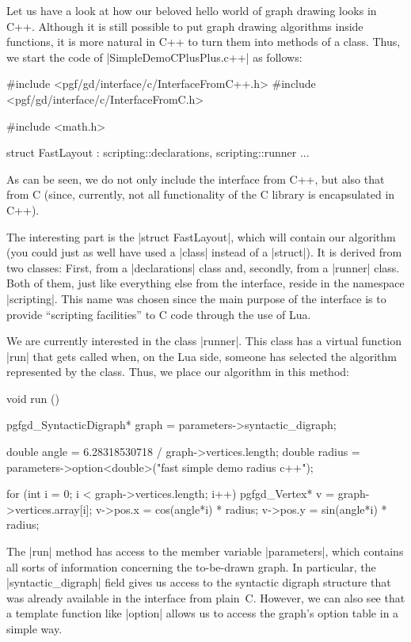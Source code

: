 Let us have a look at how our beloved hello world of graph drawing looks in
C++. Although it is still possible to put graph drawing algorithms inside
functions, it is more natural in C++ to turn them into methods of a class.
Thus, we start the code of |SimpleDemoCPlusPlus.c++| as follows:
%
\begin{codeexample}[code only, tikz syntax=false]
#include <pgf/gd/interface/c/InterfaceFromC++.h>
#include <pgf/gd/interface/c/InterfaceFromC.h>

#include <math.h>

struct FastLayout : scripting::declarations, scripting::runner {
  ...
}
\end{codeexample}

As can be seen, we do not only include the interface from C++, but also that
from C (since, currently, not all functionality of the C library is
encapsulated in C++).

The interesting part is the |struct FastLayout|, which will contain our
algorithm (you could just as well have used a |class| instead of a |struct|).
It is derived from two classes: First, from a |declarations| class and,
secondly, from a |runner| class. Both of them, just like everything else from
the interface, reside in the namespace |scripting|. This name was chosen since
the main purpose of the interface is to provide ``scripting facilities'' to C
code through the use of Lua.

We are currently interested in the class |runner|. This class has a virtual
function |run| that gets called when, on the Lua side, someone has selected the
algorithm represented by the class. Thus, we place our algorithm in this
method:
%
\begin{codeexample}[code only, tikz syntax=false]
void run () {
  pgfgd_SyntacticDigraph* graph = parameters->syntactic_digraph;

  double angle  = 6.28318530718 / graph->vertices.length;
  double radius = parameters->option<double>("fast simple demo radius c++");

  for (int i = 0; i < graph->vertices.length; i++) {
    pgfgd_Vertex* v = graph->vertices.array[i];
    v->pos.x = cos(angle*i) * radius;
    v->pos.y = sin(angle*i) * radius;
  }
}
\end{codeexample}

The |run| method has access to the member variable |parameters|, which contains
all sorts of information concerning the to-be-drawn graph. In particular, the
|syntactic_digraph| field gives us access to the syntactic digraph structure
that was already available in the interface from plain~C. However, we can also
see that a template function like |option| allows us to access the graph's
option table in a simple way.

